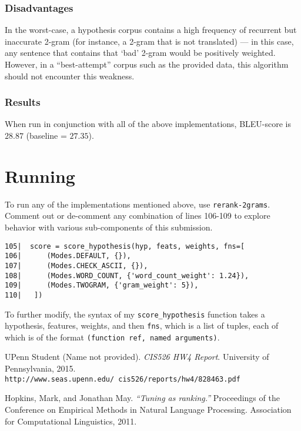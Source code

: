 \documentclass{article}
\begin{document}
\subsubsection{Disadvantages}
In the worst-case, a hypothesis corpus contains a high frequency of recurrent but inaccurate 2-gram (for instance, a 2-gram that is not translated) — in this case, any sentence that contains that `bad' 2-gram would be positively weighted. However, in a ``best-attempt'' corpus such as the provided data, this algorithm should not encounter this weakness.

\subsubsection{Results}
When run in conjunction with all of the above implementations, BLEU-score is $28.87$ (baseline = $27.35$).

\section{Running}
To run any of the implementations mentioned above, use \texttt{rerank-2grams}. Comment out or de-comment any combination of lines 106-109 to explore behavior with various sub-components of this submission.

\begin{verbatim}
105|  score = score_hypothesis(hyp, feats, weights, fns=[
106|      (Modes.DEFAULT, {}),
107|      (Modes.CHECK_ASCII, {}),
108|      (Modes.WORD_COUNT, {'word_count_weight': 1.24}),
109|      (Modes.TWOGRAM, {'gram_weight': 5}),
110|   ])
\end{verbatim}

To further modify, the syntax of my \texttt{score\_hypothesis} function takes a hypothesis, features, weights, and then \texttt{fns}, which is a list of tuples, each of which is of the format \texttt{(function ref, named arguments)}.

\medskip

\begin{thebibliography}{9}
UPenn Student (Name not provided).
\textit{CIS526 HW4 Report}.
University of Pennsylvania, 2015. \texttt{http://www.seas.upenn.edu/~cis526/reports/hw4/828463.pdf}

Hopkins, Mark, and Jonathan May. \textit{``Tuning as ranking.''}
Proceedings of the Conference on Empirical Methods in Natural Language Processing. Association for Computational Linguistics, 2011.

\end{thebibliography}
\end{document}
